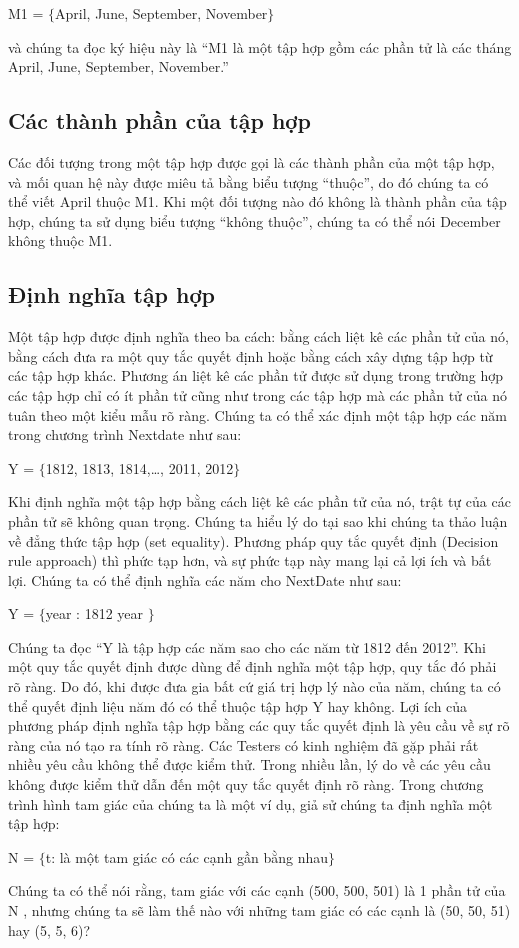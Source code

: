 \documentclass[11pt,a4paper,oneside]{article}
\begin{document}
\begin{center}
M1 = $\{$April,  June,  September, November$\}$\\
\end{center}
và chúng ta đọc ký hiệu này là “M1 là một tập hợp gồm các phần tử là các tháng April, June, September, November.”
\subsection{Các thành phần của tập hợp}
Các đối tượng trong một tập hợp được gọi là các thành phần của một tập hợp, và mối quan hệ này được miêu tả bằng biểu tượng “thuộc”, do đó chúng ta có thể viết April thuộc M1. Khi một đối tượng nào đó không là thành phần của tập hợp, chúng ta sử dụng biểu tượng “không thuộc”, chúng ta có thể nói December không thuộc M1.

\subsection{Định nghĩa tập hợp}
Một tập hợp được định nghĩa theo ba cách: bằng cách liệt kê các phần tử của nó, bằng cách đưa ra một quy tắc quyết định hoặc bằng cách xây dựng tập hợp từ các tập hợp khác. Phương án liệt kê các phần tử được sử dụng trong trường hợp các tập hợp chỉ có ít phần tử cũng như trong các tập hợp mà các phần tử của nó tuân theo một kiểu mẫu rõ ràng. Chúng ta có thể xác định một tập hợp các năm trong chương trình Nextdate như sau:
\begin{center}
Y = $\{$1812, 1813, 1814,\ldots, 2011, 2012$\}$\\
\end{center}
Khi định nghĩa một tập hợp bằng cách liệt kê các phần tử của nó, trật tự của các phần tử sẽ không quan trọng. Chúng ta hiểu lý do tại sao khi chúng ta thảo luận về đẳng thức tập hợp (set equality). Phương pháp quy tắc quyết định (Decision rule approach) thì phức tạp hơn, và sự phức tạp này mang lại cả lợi ích và bất lợi. Chúng ta có thể định nghĩa các năm cho NextDate như sau:
\begin{center}
Y = $\{$year :  1812 \leq year $\}$\\
\end{center}
Chúng ta đọc “Y là tập hợp các năm sao cho các năm từ 1812 đến 2012”. Khi một quy tắc quyết định được dùng để định nghĩa một tập hợp, quy tắc đó phải rõ ràng. Do đó, khi được đưa gia bất cứ giá trị hợp lý nào của năm, chúng ta có thể quyết định liệu năm đó có thể thuộc tập hợp Y hay không. Lợi ích của phương pháp định nghĩa tập hợp bằng các quy tắc quyết định là yêu cầu về sự rõ ràng của nó tạo ra tính rõ ràng. Các Testers có kinh nghiệm đã gặp phải rất nhiều yêu cầu không thể được kiểm thử. Trong nhiều lần, lý do về các yêu cầu không được kiểm thử dẫn đến một quy tắc quyết định rõ ràng. Trong chương trình hình tam giác của chúng ta là một ví dụ, giả sử chúng ta định nghĩa một tập hợp:
\begin{center}
N = $\{$t: là một tam giác có các cạnh gần bằng nhau$\}$\\
\end{center}
Chúng ta có thể nói rằng, tam giác với các cạnh (500, 500, 501) là 1 phần tử của N , nhưng chúng ta sẽ làm thế nào với những tam giác có các cạnh là  (50, 50, 51) hay (5, 5, 6)?
\end{document}
